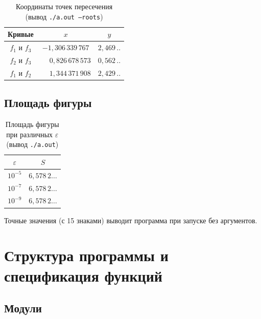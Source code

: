 \documentclass[a4paper,12pt,titlepage,finall]{article}
\begin{document}
\begin{table}[h]
\centering
\begin{tabular}{|c|c|c|}
\hline
Кривые & $x$ & $y$ \\
\hline
$f_1$ и $f_3$ & $-1{,}306\,339\,767$ & $2{,}469\,..$ \\
$f_2$ и $f_3$ & $\phantom{-}0{,}826\,678\,573$ & $0{,}562\,..$ \\
$f_1$ и $f_2$ & $\phantom{-}1{,}344\,371\,908$ & $2{,}429\,..$ \\
\hline
\end{tabular}
\caption{Координаты точек пересечения (вывод \texttt{./a.out --roots})}
\label{table1}
\end{table}

\subsection{Площадь фигуры}

\begin{table}[h]
\centering
\begin{tabular}{|c|c|}
\hline
$\varepsilon$ & $S$ \\
\hline
$10^{-5}$ & $6{,}578\,2\ldots$ \\
$10^{-7}$ & $6{,}578\,2\ldots$ \\
$10^{-9}$ & $6{,}578\,2\ldots$ \\
\hline
\end{tabular}
\caption{Площадь фигуры при различных $\varepsilon$ (вывод \texttt{./a.out})}
\label{table2}
\end{table}

Точные значения (с 15 знаками) выводит программа при запуске без аргументов.

\newpage

\section{Структура программы и спецификация функций}

\subsection{Модули}
\end{document}
